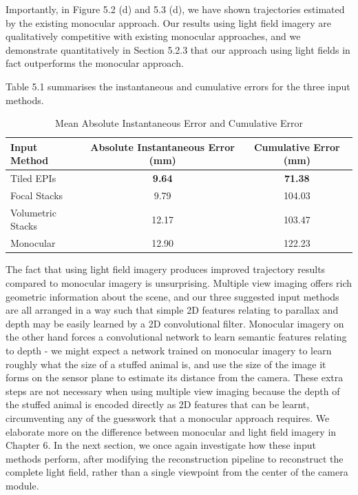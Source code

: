 Importantly, in Figure 5.2 (d) and 5.3 (d), we have shown trajectories estimated by the existing monocular approach. Our results using light field imagery are qualitatively competitive with existing monocular approaches, and we demonstrate quantitatively in Section 5.2.3 that our approach using light fields in fact outperforms the monocular approach. 


Table 5.1 summarises the instantaneous and cumulative errors for the three input methods. 
 
\begin{table}[htbp]
    \caption{Mean Absolute Instantaneous Error and Cumulative Error}
    \centering
    \begin{tabular}{@{}lcc@{}}
        \toprule
        Input Method        & Absolute Instantaneous Error (mm)   & Cumulative Error (mm) \\
        \midrule 
        Tiled EPIs & \textbf{9.64} & \textbf{71.38} \\
        Focal Stacks & 9.79 & 104.03 \\
        Volumetric Stacks & 12.17 & 103.47 \\
        Monocular & 12.90 & 122.23 \\
        \bottomrule
        
    \end{tabular}
\end{table}

The fact that using light field imagery produces improved trajectory results compared to monocular imagery is unsurprising. Multiple view imaging offers rich geometric information about the scene, and our three suggested input methods are all arranged in a way such that simple 2D features relating to parallax and depth may be easily learned by a 2D convolutional filter. Monocular imagery on the other hand forces a convolutional network to learn semantic features relating to depth - we might expect a network trained on monocular imagery to learn roughly what the size of a stuffed animal is, and use the size of the image it forms on the sensor plane to estimate its distance from the camera. These extra steps are not necessary when using multiple view imaging because the depth of the stuffed animal is encoded directly as 2D features that can be learnt, circumventing any of the guesswork that a monocular approach requires. We elaborate more on the difference between monocular and light field imagery in Chapter 6. In the next section, we once again investigate how these input methods perform, after modifying the reconstruction pipeline to reconstruct the complete light field, rather than a single viewpoint from the center of the camera module. 

